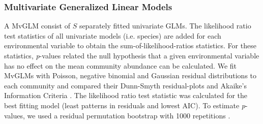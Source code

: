 \documentclass[a4paper,11pt]{article}
\begin{document}
        \subsubsection{Multivariate Generalized Linear Models}
		A MvGLM consist of $S$ separately fitted univariate GLMs. 
		The likelihood ratio test statistics of all univariate models (i.e. species) are added for each environmental variable to obtain the sum-of-likelihood-ratios statistics.  
		For these statistics, \textit{p}-values related the null hypothesis that a given environmental variable has no effect on the mean community abundance can be calculated. 
		We fit MvGLMs with Poisson, negative binomial and Gaussian residual distributions to each community and compared their Dunn-Smyth residual-plots \citep{dunn1996randomized} and Akaike's Information Criteria \citep[AIC, ][]{akaike1974new}.
		The likelihood ratio test statistic was calculated for the best fitting model (least patterns in residuals and lowest AIC).
	    To estimate \textit{p}-values, we used a residual permutation bootstrap with 1000 repetitions \citep{davidsonbootstrap}.
	
\end{document}
